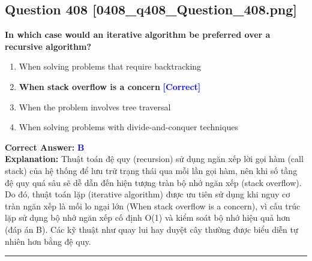 \documentclass[11pt,a4paper]{article}
\begin{document}
\begin{minipage}{\textwidth}
\subsection*{Question 408 \quad \footnotesize{[0408\_q408\_Question\_408.png]}}
\noindent \textbf{In which case would an iterative algorithm be preferred over a recursive algorithm?}

\begin{enumerate}[label=\Alph*.]
    \item When solving problems that require backtracking
    \item \textbf{When stack overflow is a concern} \hfill \textcolor{blue}{\textbf{[Correct]}}
    \item When the problem involves tree traversal
    \item When solving problems with divide-and-conquer techniques
\end{enumerate}

\noindent \textbf{Correct Answer:} \textcolor{blue}{\textbf{B}} \\[2pt]
\noindent \textbf{Explanation:} Thuật toán đệ quy (recursion) sử dụng ngăn xếp lời gọi hàm (call stack) của hệ thống để lưu trữ trạng thái qua mỗi lần gọi hàm, nên khi số tầng đệ quy quá sâu sẽ dễ dẫn đến hiện tượng tràn bộ nhớ ngăn xếp (stack overflow). Do đó, thuật toán lặp (iterative algorithm) được ưu tiên sử dụng khi nguy cơ tràn ngăn xếp là mối lo ngại lớn (When stack overflow is a concern), vì cấu trúc lặp sử dụng bộ nhớ ngăn xếp cố định O(1) và kiểm soát bộ nhớ hiệu quả hơn (đáp án B). Các kỹ thuật như quay lui hay duyệt cây thường được biểu diễn tự nhiên hơn bằng đệ quy.

\par\vspace{0.3cm}
\hrule
\vspace{0.3cm}
\end{minipage}
\end{document}

